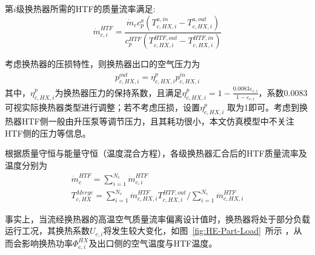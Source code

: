 第$i$级换热器所需的HTF的质量流率满足:
\begin{equation}
\label{equ:he-comp-mass-flow}
\dot m_{c,i}^{HTF} = \frac{{{{\dot m}_c}c_p^a({T_{c,HX,i}^{a,in} - T_{c,HX,i}^{a,out}} )}}{{c_p^{HTF}( {T_{c,HX,i}^{HTF,out} - T_{c,HX,i}^{HTF,in}})}}
\end{equation}

考虑换热器的压损特性，则换热器出口的空气压力为
\begin{subequations}
\begin{gather}
p_{c,HX,i}^{out} = \eta _{c,HX,i}^pp_{c,HX,i}^{in}\label{equ:he-comp-pressure-out}
\end{gather}
\end{subequations}
其中，$\eta _{c,HX,i}^p$为换热器压力的保持系数\cite{Thesis-Lixuemei}，且满足$\eta _{c,HX,i}^p = 1 - \frac{{0.0083{\varepsilon _{c,i}}}}{{1 - {\varepsilon _{c,i}}}}$，系数0.0083可视实际换热器类型进行调整；若不考虑压损，设置$\eta _{c,HX,i}^p$ 取为1即可。考虑到换热器HTF侧一般由升压泵等调节压力，且其耗功很小，本文仿真模型中不关注HTF侧的压力等信息。

根据质量守恒与能量守恒（温度混合方程），各级换热器汇合后的HTF质量流率及温度分别为
\begin{subequations}
\begin{gather}
\dot m_c^{HTF} = \sum\limits_{i = 1}^{{N_c}} {\dot m_{c,i}^{HTF}} \label{equ:he-comp-mix-mass-flow}\\
T_{c,HX}^{Merge} = {{\sum\limits_{i = 1}^{{N_c}} {\dot m_{c,HX,i}^{HTF}T_{c,HX,i}^{HTF,out}} }}/{{\sum\limits_{i = 1}^{{N_c}} {\dot m_{c,HX,i}^{HTF}}}}  \label{equ:he-comp-mix-temp}
\end{gather}
\end{subequations}

事实上，当流经换热器的高温空气质量流率偏离设计值时，换热器将处于部分负载运行工况，其换热系数$U_{c,i}$将发生较大变化，如图~\ref{fig:HE-Part-Load}~所示
\cite{HE-Eff-CN-17,CAES-Review-18-Rui-operation}，从而会影响换热功率$\Phi _{c,i}^{HX}$及出口侧的空气温度与HTF温度。

